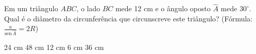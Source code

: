 Em um triângulo $ABC$, o lado $BC$ mede 12 cm e o ângulo oposto $\hat{A}$ mede $30^\circ$. Qual é o diâmetro da circunferência que circunscreve este triângulo? (Fórmula: $\frac{a}{\text{sen}\,\hat{A}} = 2R$)

\parbox{\linewidth}{

24 cm
48 cm
12 cm
6 cm
36 cm

}





